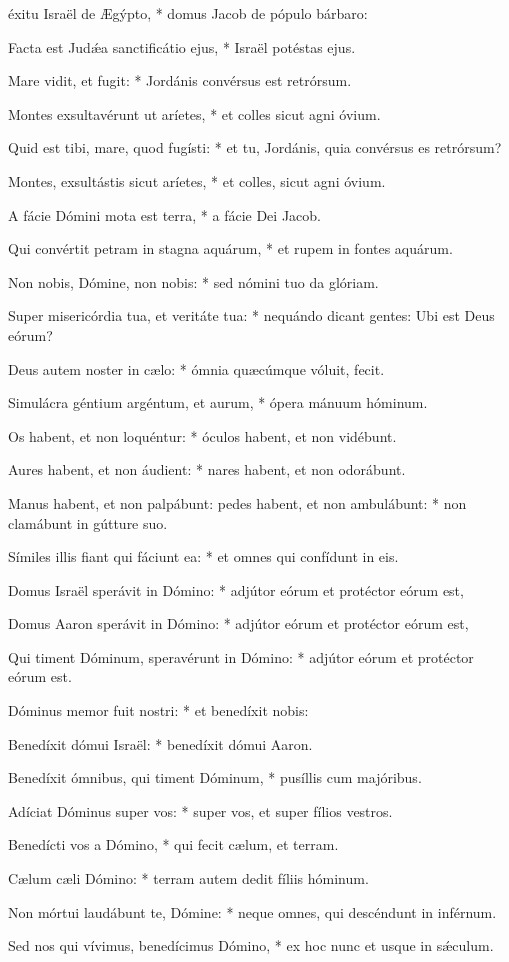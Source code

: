\begin{psalmus}

     éxitu Israël de Ægýpto, * domus Jacob de pópulo bárbaro:

    Facta est Judǽa sanctificátio ejus, * Israël potéstas ejus.

    Mare vidit, et fugit: * Jordánis convérsus est retrórsum.

    Montes exsultavérunt ut aríetes, * et colles sicut agni óvium.

    Quid est tibi, mare, quod fugísti: * et tu, Jordánis, quia convérsus es retrórsum?

    Montes, exsultástis sicut aríetes, * et colles, sicut agni óvium.

    A fácie Dómini mota est terra, * a fácie Dei Jacob.

    Qui convértit petram in stagna aquárum, * et rupem in fontes aquárum.

    Non nobis, Dómine, non nobis: * sed nómini tuo da glóriam.

    Super misericórdia tua, et veritáte tua: * nequándo dicant gentes: Ubi est Deus eórum?

    Deus autem noster in cælo: * ómnia quæcúmque vóluit, fecit.

    Simulácra géntium argéntum, et aurum, * ópera mánuum hóminum.

    Os habent, et non loquéntur: * óculos habent, et non vidébunt.

    Aures habent, et non áudient: * nares habent, et non odorábunt.

    Manus habent, et non palpábunt: pedes habent, et non ambulábunt: * non clamábunt in gútture suo.

    Símiles illis fiant qui fáciunt ea: * et omnes qui confídunt in eis.

    Domus Israël sperávit in Dómino: * adjútor eórum et protéctor eórum est,

    Domus Aaron sperávit in Dómino: * adjútor eórum et protéctor eórum est,

    Qui timent Dóminum, speravérunt in Dómino: * adjútor eórum et protéctor eórum est.

    Dóminus memor fuit nostri: * et benedíxit nobis:

    Benedíxit dómui Israël: * benedíxit dómui Aaron.

    Benedíxit ómnibus, qui timent Dóminum, * pusíllis cum majóribus.

    Adíciat Dóminus super vos: * super vos, et super fílios vestros.

    Benedícti vos a Dómino, * qui fecit cælum, et terram.

    Cælum cæli Dómino: * terram autem dedit fíliis hóminum.

    Non mórtui laudábunt te, Dómine: * neque omnes, qui descéndunt in inférnum.

    Sed nos qui vívimus, benedícimus Dómino, * ex hoc nunc et usque in sǽculum.

\end{psalmus}
